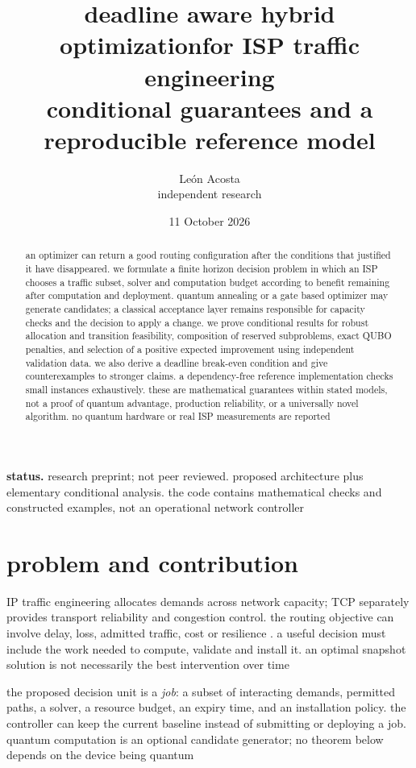 \documentclass[11pt,a4paper]{article}
\title{deadline aware hybrid optimization\newline for ISP traffic engineering\\[5pt]\large conditional guarantees and a reproducible reference model}
\author{Le\'on Acosta\\\small independent research}
\date{11 October 2026}
\newcommand{\1}{\mathbf{1}}
\begin{document}
\maketitle
\begin{abstract}
an optimizer can return a good routing configuration after the conditions that justified it have disappeared. we formulate a finite horizon decision problem in which an ISP chooses a traffic subset, solver and computation budget according to benefit remaining after computation and deployment. quantum annealing or a gate based optimizer may generate candidates; a classical acceptance layer remains responsible for capacity checks and the decision to apply a change. we prove conditional results for robust allocation and transition feasibility, composition of reserved subproblems, exact QUBO penalties, and selection of a positive expected improvement using independent validation data. we also derive a deadline break-even condition and give counterexamples to stronger claims. a dependency-free reference implementation checks small instances exhaustively. these are mathematical guarantees within stated models, not a proof of quantum advantage, production reliability, or a universally novel algorithm. no quantum hardware or real ISP measurements are reported
\end{abstract}
\textbf{status.} research preprint; not peer reviewed. proposed architecture plus elementary conditional analysis. the code contains mathematical checks and constructed examples, not an operational network controller

\section{problem and contribution}
IP traffic engineering allocates demands across network capacity; TCP separately provides transport reliability and congestion control. the routing objective can involve delay, loss, admitted traffic, cost or resilience \cite{rfc}. a useful decision must include the work needed to compute, validate and install it. an optimal snapshot solution is not necessarily the best intervention over time

the proposed decision unit is a \emph{job}: a subset of interacting demands, permitted paths, a solver, a resource budget, an expiry time, and an installation policy. the controller can keep the current baseline instead of submitting or deploying a job. quantum computation is an optional candidate generator; no theorem below depends on the device being quantum
\end{document}

